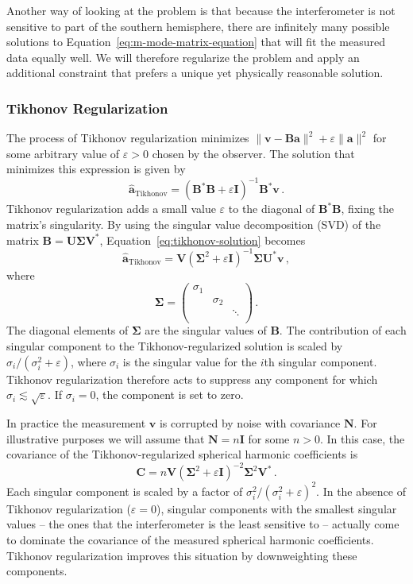 \documentclass[twocolumn]{aastex61}
\renewcommand{\b}{\pmb}
\newcommand{\atikh}{\b{\hat a}_\text{Tikhonov}}
\begin{document}
Another way of looking at the problem is that because the interferometer is not sensitive to part of
the southern hemisphere, there are infinitely many possible solutions to
Equation~\ref{eq:m-mode-matrix-equation} that will fit the measured data equally well.  We will
therefore regularize the problem and apply an additional constraint that prefers a unique yet
physically reasonable solution.

\subsubsection{Tikhonov Regularization}

The process of Tikhonov regularization minimizes $\|\b v - \b B\b a\|^2 + \varepsilon\|\b a\|^2$ for
some arbitrary value of $\varepsilon > 0$ chosen by the observer. The solution that minimizes this
expression is given by
\begin{equation}\label{eq:tikhonov-solution}
    \atikh = (\b B^*\b B + \varepsilon\b I)^{-1}\b B^*\b v\,.
\end{equation}
Tikhonov regularization adds a small value $\varepsilon$ to the diagonal of $\b B^*\b B$, fixing the
matrix's singularity. By using the singular value decomposition (SVD) of the matrix $\b B = \b U \b
\Sigma \b V^*$, Equation~\ref{eq:tikhonov-solution} becomes
\begin{equation}
    \atikh = \b V (\b\Sigma^2 + \varepsilon \b I)^{-1}\b\Sigma \b U^*\b v\,,
\end{equation}
where
\[
    \b\Sigma = \left(
        \begin{array}{ccc}
            \sigma_1 & & \\
                     & \sigma_2 & \\
                     & & \ddots \\
        \end{array}
    \right)\,.
\]
The diagonal elements of $\b\Sigma$ are the singular values of $\b B$. The contribution of each
singular component to the Tikhonov-regularized solution is scaled by $\sigma_i / (\sigma_i^2 +
\varepsilon)$, where $\sigma_i$ is the singular value for the $i$th singular component. Tikhonov
regularization therefore acts to suppress any component for which
$\sigma_i\lesssim\sqrt{\varepsilon}$.  If $\sigma_i = 0$, the component is set to zero.

In practice the measurement $\b v$ is corrupted by noise with covariance $\b N$. For illustrative
purposes we will assume that $\b N=n\b I$ for some $n>0$. In this case, the covariance of the
Tikhonov-regularized spherical harmonic coefficients is
\begin{equation}
    \b C = n \b V (\b\Sigma^2 + \varepsilon\b I)^{-2} \b\Sigma^2 \b V^*\,.
\end{equation}
Each singular component is scaled by a factor of $\sigma_i^2/(\sigma_i^2 + \varepsilon)^2$.  In the
absence of Tikhonov regularization ($\varepsilon=0$), singular components with the smallest singular
values -- the ones that the interferometer is the least sensitive to -- actually come to dominate
the covariance of the measured spherical harmonic coefficients. Tikhonov regularization improves
this situation by downweighting these components.
\end{document}
